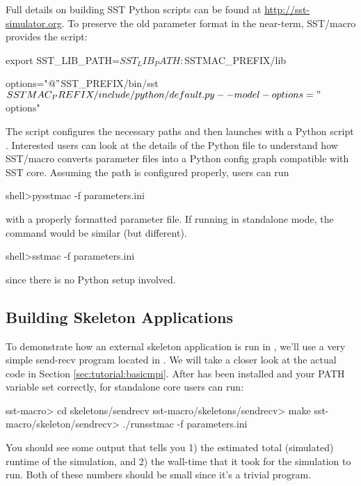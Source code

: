 Full details on building SST Python scripts can be found at \url{http://sst-simulator.org}.  To preserve the old parameter format in the near-term, SST/macro provides the  script:

\begin{ViFile}
export SST_LIB_PATH=$SST_LIB_PATH:$SSTMAC_PREFIX/lib

options="$@"
$SST_PREFIX/bin/sst $SSTMAC_PREFIX/include/python/default.py --model-options="$options"
\end{ViFile}

The script configures the necessary paths and then launches with a Python script .  Interested users can look at the details of the Python file to understand how SST/macro converts parameter files into a Python config graph compatible with SST core.
Assuming the path is configured properly, users can run

\begin{ShellCmd}
shell>pysstmac -f parameters.ini
\end{ShellCmd}
with a properly formatted parameter file. If running in standalone mode, the command would be similar (but different).

\begin{ShellCmd}
shell>sstmac -f parameters.ini
\end{ShellCmd}
since there is no Python setup involved.

\subsection{Building Skeleton Applications}
\label{sec:tutorial:runapp}

To demonstrate how an external skeleton application is run in \sstmacro, we'll use a very simple send-recv program located in .
We will take a closer look at the actual code in Section \ref{sec:tutorial:basicmpi}.
After \sstmacro has been installed and your PATH variable set correctly, for standalone core users can run:

\begin{ShellCmd}
sst-macro> cd skeletons/sendrecv
sst-macro/skeletons/sendrecv> make
sst-macro/skeleton/sendrecv> ./runsstmac -f parameters.ini
\end{ShellCmd}

You should see some output that tells you 1) the estimated total (simulated) runtime of the simulation, and 
2) the wall-time that it took for the simulation to run.  
Both of these numbers should be small since it's a trivial program. 

